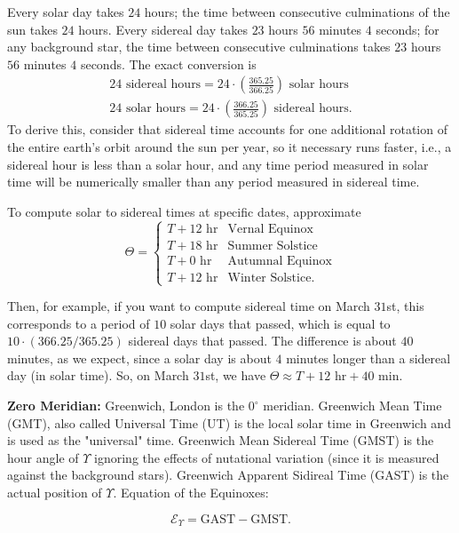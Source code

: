 \documentclass[12pt]{article}
\newcommand{\V}{

\vspace{\baselineskip}

}
\begin{document}
Every solar day takes $24$ hours; the time between consecutive culminations of the sun takes $24$ hours. Every sidereal day takes $23$ hours $56$ minutes $4$ seconds; for any background star, the time between consecutive culminations takes $23$ hours $56$ minutes $4$ seconds. The exact conversion is 
\begin{gather*}
    24\text{ sidereal hours} = 24\cdot \left(\frac{365.25}{366.25}\right)\text{ solar hours} \\
    24\text{ solar hours} = 24\cdot \left(\frac{366.25}{365.25}\right)\text{ sidereal hours}. 
\end{gather*}
To derive this, consider that sidereal time accounts for one additional rotation of the entire earth's orbit around the sun per year, so it necessary runs faster, i.e., a sidereal hour is less than a solar hour, and any time period measured in solar time will be numerically smaller than any period measured in sidereal time.\V

To compute solar to sidereal times at specific dates, approximate 
\[
\Theta = \begin{cases}
    T + 12\text{ hr} & \text{Vernal Equinox} \\
    T + 18\text{ hr} & \text{Summer Solstice} \\
    T + 0\text{ hr} & \text{Autumnal Equinox} \\
    T + 12\text{ hr} & \text{Winter Solstice}. 
\end{cases}
\]

Then, for example, if you want to compute sidereal time on March $31$st, this corresponds to a period of $10$ solar days that passed, which is equal to $10\cdot (366.25/365.25)$ sidereal days that passed. The difference is about $40$ minutes, as we expect, since a solar day is about $4$ minutes longer than a sidereal day (in solar time). So, on March $31$st, we have $\Theta \approx T + 12\text{ hr} + 40\text{ min}$.\V

\textbf{Zero Meridian:} Greenwich, London is the $0^{\circ}$ meridian. Greenwich Mean Time (GMT), also called Universal Time (UT) is the local solar time in Greenwich and is used as the "universal" time. Greenwich Mean Sidereal Time (GMST) is the hour angle of $\Upsilon$ ignoring the effects of nutational variation (since it is measured against the background stars). Greenwich Apparent Sidireal Time (GAST) is the actual position of $\Upsilon$. Equation of the Equinoxes: 

\begin{equation*}
    \mathcal{E}_{\Upsilon} = \text{GAST} - \text{GMST}.
\end{equation*}
\end{document}
